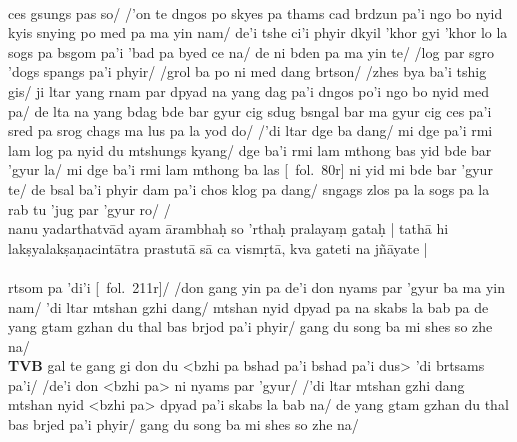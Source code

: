 \documentclass[12pt]{article}
\begin{document}
\textbf{\TVB}\\
ces gsungs pas so/ /'on te dngos po skyes pa thams cad brdzun pa'i ngo bo nyid kyis snying po med pa ma yin nam/ de'i tshe ci'i phyir dkyil 'khor gyi 'khor lo la sogs pa bsgom pa'i 'bad pa byed ce na/ de ni bden pa ma yin te/ /log par sgro 'dogs spangs pa'i phyir/ /grol ba po ni med dang brtson/ /zhes bya ba'i tshig gis/ ji ltar yang rnam par dpyad na yang dag pa'i dngos po'i ngo bo nyid med pa/ de lta na yang bdag bde bar gyur cig sdug bsngal bar ma gyur cig ces pa'i sred pa srog chags ma lus pa la yod do/ /'di ltar dge ba dang/ mi dge pa'i rmi lam log pa nyid du mtshungs kyang/ dge ba'i rmi lam mthong bas yid bde bar 'gyur la/ mi dge ba'i rmi lam mthong ba las [\TVB\ fol.\ 80r] ni yid mi bde bar 'gyur te/ de bsal ba'i phyir dam pa'i chos klog pa dang/ sngags zlos pa la sogs pa la rab tu 'jug par 'gyur ro/ /\\

nanu yadarthatvād ayam ārambhaḥ so 'rthaḥ pralayaṃ gataḥ | tathā hi lakṣyalakṣaṇacintātra prastutā sā ca vismṛtā, kva gateti na jñāyate |\\

\textbf{\TVA}\\
rtsom pa 'di'i [\TVA\ fol.\ 211r]/ /don gang yin pa de'i don nyams par 'gyur ba ma yin nam/ 'di ltar mtshan gzhi dang/ mtshan nyid dpyad pa na skabs la bab pa de yang gtam gzhan du thal bas brjod pa'i phyir/ gang du song ba mi shes so zhe na/ \\

\textbf{TVB}
gal te gang gi don du <bzhi pa bshad pa'i bshad pa'i dus> 'di brtsams pa'i/ /de'i don <bzhi pa> ni nyams par 'gyur/ /'di ltar mtshan gzhi dang mtshan nyid <bzhi pa> dpyad pa'i skabs la bab na/ de yang gtam gzhan du thal bas brjed pa'i phyir/ gang du song ba mi shes so zhe na/\\
\end{document}
